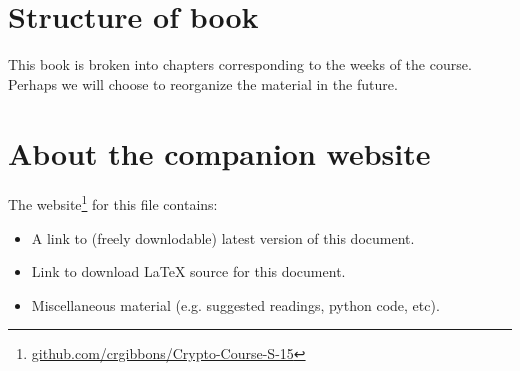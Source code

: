 \section*{Structure of book}
This book is broken into chapters corresponding to the weeks of the course.  Perhaps we will choose to reorganize the material in the future.

\section*{About the companion website}
The website\footnote{\href{https://github.com/crgibbons/Crypto-Course-S-15}{github.com/crgibbons/Crypto-Course-S-15}} for this file contains:
\begin{itemize}
  \item A link to (freely downlodable) latest version of this document.
  \item Link to download LaTeX source for this document.
  \item Miscellaneous material (e.g. suggested readings, python code, etc).
\end{itemize}

